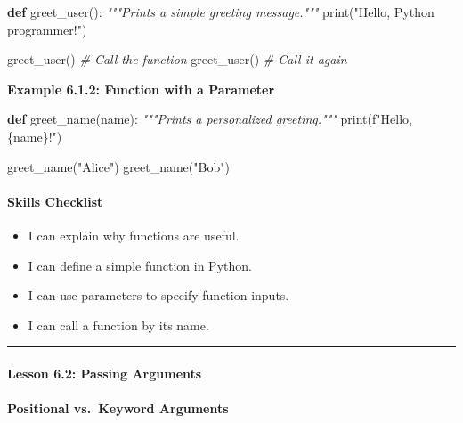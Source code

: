 \documentclass[
  justified,
  openright,
]{tufte-book}
\let\subsection\paragraph
\let\paragraph\paragraph
\newcommand{\KeywordTok}[1]{\textcolor{CodeKeyword}{\textbf{#1}}}  %
\newcommand{\StringTok}[1]{\textcolor{CodeString}{#1}}              %
\newcommand{\CommentTok}[1]{\textcolor{CodeComment}{\textit{#1}}}  %
\newenvironment{Shaded}{%
  \begin{mdframed}[style=TufteCode]%
}{%
  \end{mdframed}%
}
\let\subsection\paragraph
\let\paragraph\paragraph
\providecommand{\tightlist}{%
  \setlength{\itemsep}{0pt}\setlength{\parskip}{0pt}}
\begin{document}
\begin{Shaded}
\begin{Highlighting}[]
\KeywordTok{def} greet\_user():
    \CommentTok{"""Prints a simple greeting message."""}
    print(\StringTok{"Hello, Python programmer!"})
 
greet\_user()   \CommentTok{\# Call the function}
greet\_user()   \CommentTok{\# Call it again}
\end{Highlighting}
\end{Shaded}

\textbf{Example 6.1.2: Function with a Parameter}

\begin{Shaded}
\begin{Highlighting}[]
\KeywordTok{def} greet\_name(name):
    \CommentTok{"""Prints a personalized greeting."""}
    print(\StringTok{f"Hello, }\StringTok{\{}name\StringTok{\}}\StringTok{!"})
 
greet\_name(\StringTok{"Alice"})
greet\_name(\StringTok{"Bob"})
\end{Highlighting}
\end{Shaded}

\subsection{Skills Checklist}\label{skills-checklist-27}

\begin{itemize}
\tightlist
\item[$\square$]
  I can explain why functions are useful.
\item[$\square$]
  I can define a simple function in Python.
\item[$\square$]
  I can use parameters to specify function inputs.
\item[$\square$]
  I can call a function by its name.
\end{itemize}

\begin{center}\rule{0.5\linewidth}{0.5pt}\end{center}

\subsection{Lesson 6.2: Passing
Arguments}\label{lesson-6.2-passing-arguments}

\subsection{Positional vs.~Keyword
Arguments}\label{positional-vs.-keyword-arguments}
\end{document}
